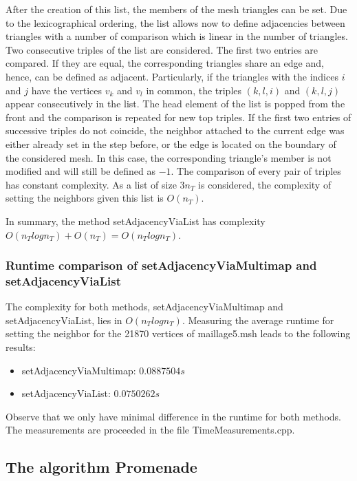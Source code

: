 \documentclass[10pt]{article}
\begin{document}
After the creation of this list, the members of the mesh triangles can be set. Due to the lexicographical ordering, the list allows now to define adjacencies between triangles with a number of comparison which is linear in the number of triangles. Two consecutive triples of the list are considered. The first two entries are compared. If they are equal, the corresponding triangles share an edge and, hence, can be defined as adjacent. Particularly, if the triangles with the indices $i$ and $j$ have the vertices $v_k$ and $v_l$ in common, the triples $({k},{l},i)$ and $({k},{l},j)$ appear consecutively in the list. The head element of the list is popped from the front and the comparison is repeated for new top triples. If the first two entries of successive triples do not coincide, the neighbor attached to the current edge was either already set in the step before, or the edge is located on the boundary of the considered mesh. In this case, the corresponding triangle's member is not modified and will still be defined as $-1$. The comparison of every pair of triples has constant complexity. As a list of size $3 n_T$ is considered, the complexity of setting the neighbors given this list is $O(n_T)$.

In summary, the method {\ttfamily setAdjacencyViaList} has complexity $O(n_Tlogn_T) + O(n_T) = O(n_Tlogn_T)$.

\subsubsection{Runtime comparison of setAdjacencyViaMultimap and setAdjacencyViaList}

The complexity for both methods, {\ttfamily setAdjacencyViaMultimap} and {\ttfamily setAdjacencyViaList}, lies in $O(n_Tlogn_T)$. Measuring the average runtime for setting the neighbor for the 21870 vertices of maillage5.msh leads to the following results: 

\begin{itemize}
	\item {\ttfamily setAdjacencyViaMultimap}: $ 0.0887504 s$
	\item {\ttfamily setAdjacencyViaList}: $ 0.0750262 s $
\end{itemize}

Observe that we only have minimal difference in the runtime for both methods. The measurements are proceeded in the file TimeMeasurements.cpp.


\subsection{The algorithm Promenade} \label{promenade}
\end{document}
